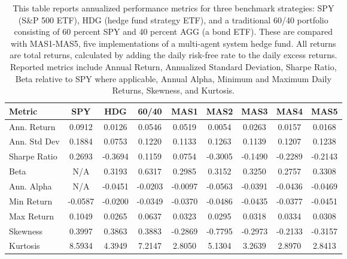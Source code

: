 \begin{table}[htbp]
\centering
\begin{tabular}{lcccccccc}
\toprule
Metric & SPY & HDG & 60/40 & MAS1 & MAS2 & MAS3 & MAS4 & MAS5 \\
\midrule
Ann. Return & 0.0912 & 0.0126 & 0.0546 & 0.0519 & 0.0054 & 0.0263 & 0.0157 & 0.0168 \\
Ann. Std Dev & 0.1884 & 0.0753 & 0.1220 & 0.1133 & 0.1263 & 0.1139 & 0.1207 & 0.1238 \\
Sharpe Ratio & 0.2693 & -0.3694 & 0.1159 & 0.0754 & -0.3005 & -0.1490 & -0.2289 & -0.2143 \\
Beta & N/A & 0.3193 & 0.6317 & 0.2985 & 0.3152 & 0.3250 & 0.2757 & 0.3308 \\
Ann. Alpha & N/A & -0.0451 & -0.0203 & -0.0097 & -0.0563 & -0.0391 & -0.0436 & -0.0469 \\
Min Return & -0.0587 & -0.0200 & -0.0349 & -0.0370 & -0.0486 & -0.0435 & -0.0377 & -0.0451 \\
Max Return & 0.1049 & 0.0265 & 0.0637 & 0.0323 & 0.0295 & 0.0318 & 0.0334 & 0.0308 \\
Skewness & 0.3997 & 0.3863 & 0.3883 & -0.2869 & -0.7795 & -0.2973 & -0.2133 & -0.3157 \\
Kurtosis & 8.5934 & 4.3949 & 7.2147 & 2.8050 & 5.1304 & 3.2639 & 2.8970 & 2.8413 \\
\bottomrule
\end{tabular}
\caption[Performance Summary Statistics]{This table reports annualized performance metrics for three benchmark strategies: SPY (S\&P 500 ETF), HDG (hedge fund strategy ETF), and a traditional 60/40 portfolio consisting of 60 percent SPY and 40 percent AGG (a bond ETF). These are compared with MAS1-MAS5, five implementations of a multi-agent system hedge fund. All returns are total returns, calculated by adding the daily risk-free rate to the daily excess returns. Reported metrics include Annual Return, Annualized Standard Deviation, Sharpe Ratio, Beta relative to SPY where applicable, Annual Alpha, Minimum and Maximum Daily Returns, Skewness, and Kurtosis.}
\label{tab:performance_summary}
\end{table}
